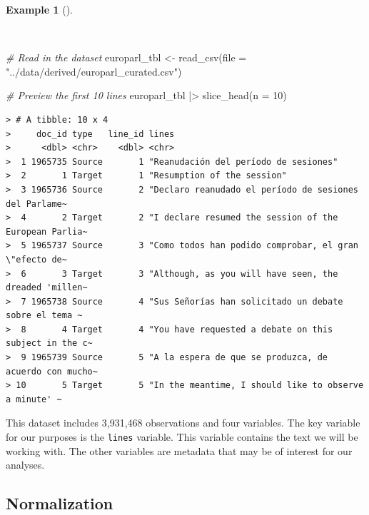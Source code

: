 \documentclass[
  letterpaper,
]{latex/krantz}
\newenvironment{Shaded}{\begin{snugshade}}{\end{snugshade}}
\newcommand{\AttributeTok}[1]{\textcolor[rgb]{0.00,0.00,0.00}{#1}}
\newcommand{\CommentTok}[1]{\textcolor[rgb]{0.00,0.00,0.00}{\textit{#1}}}
\newcommand{\DecValTok}[1]{\textcolor[rgb]{0.00,0.00,0.00}{#1}}
\newcommand{\FunctionTok}[1]{\textcolor[rgb]{0.00,0.00,0.00}{#1}}
\newcommand{\NormalTok}[1]{\textcolor[rgb]{0.00,0.00,0.00}{#1}}
\newcommand{\OtherTok}[1]{\textcolor[rgb]{0.00,0.00,0.00}{#1}}
\newcommand{\SpecialCharTok}[1]{\textcolor[rgb]{0.00,0.00,0.00}{#1}}
\newcommand{\StringTok}[1]{\textcolor[rgb]{0.00,0.00,0.00}{#1}}
\theoremstyle{definition}
\newtheorem{example}{Example}[chapter]
\theoremstyle{remark}
\begin{document}
\begin{example}[]\protect\hypertarget{exm-tb-europarl-preview}{}\label{exm-tb-europarl-preview}

~

\begin{Shaded}
\begin{Highlighting}[]
\CommentTok{\# Read in the dataset}
\NormalTok{europarl\_tbl }\OtherTok{\textless{}{-}}
  \FunctionTok{read\_csv}\NormalTok{(}\AttributeTok{file =} \StringTok{"../data/derived/europarl\_curated.csv"}\NormalTok{)}

\CommentTok{\# Preview the first 10 lines}
\NormalTok{europarl\_tbl }\SpecialCharTok{|\textgreater{}}
  \FunctionTok{slice\_head}\NormalTok{(}\AttributeTok{n =} \DecValTok{10}\NormalTok{)}
\end{Highlighting}
\end{Shaded}

\begin{verbatim}
> # A tibble: 10 x 4
>     doc_id type   line_id lines                                                 
>      <dbl> <chr>    <dbl> <chr>                                                 
>  1 1965735 Source       1 "Reanudación del período de sesiones"                 
>  2       1 Target       1 "Resumption of the session"                           
>  3 1965736 Source       2 "Declaro reanudado el período de sesiones del Parlame~
>  4       2 Target       2 "I declare resumed the session of the European Parlia~
>  5 1965737 Source       3 "Como todos han podido comprobar, el gran \"efecto de~
>  6       3 Target       3 "Although, as you will have seen, the dreaded 'millen~
>  7 1965738 Source       4 "Sus Señorías han solicitado un debate sobre el tema ~
>  8       4 Target       4 "You have requested a debate on this subject in the c~
>  9 1965739 Source       5 "A la espera de que se produzca, de acuerdo con mucho~
> 10       5 Target       5 "In the meantime, I should like to observe a minute' ~
\end{verbatim}

\end{example}

This dataset includes 3,931,468 observations and four variables. The key
variable for our purposes is the \texttt{lines} variable. This variable
contains the text we will be working with. The other variables are
metadata that may be of interest for our analyses.

\subsection{Normalization}\label{sec-td-normalization}
\end{document}
